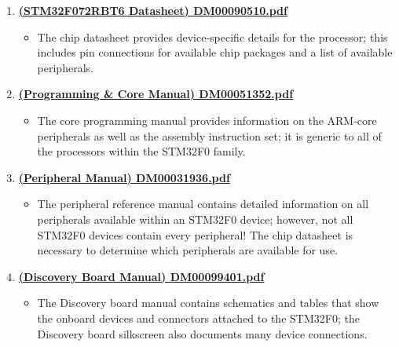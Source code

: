 \documentclass[11pt,fleqn]{book} %
\begin{document}
\begin{enumerate}
    \item \href{http://www.st.com/content/ccc/resource/technical/document/datasheet/cd/46/43/83/22/d3/40/c8/DM00090510.pdf/files/DM00090510.pdf/jcr:content/translations/en.DM00090510.pdf}{\textbf{(STM32F072RBT6 Datasheet) DM00090510.pdf}}
    \begin{itemize}
        \item The chip datasheet provides device-specific details for the processor; this includes pin connections for available chip packages and a list of available peripherals.
    \end{itemize}
    \item
    \href{http://www.st.com/content/ccc/resource/technical/document/programming_manual/fc/90/c7/17/a1/44/43/89/DM00051352.pdf/files/DM00051352.pdf/jcr:content/translations/en.DM00051352.pdf}{\textbf{(Programming \& Core Manual) DM00051352.pdf}}
    \begin{itemize}
        \item The core programming manual provides information on the ARM-core peripherals as well as the assembly instruction set; it is generic to all of the processors within the STM32F0 family.
    \end{itemize}
    \item
    \href{http://www.st.com/content/ccc/resource/technical/document/reference_manual/c2/f8/8a/f2/18/e6/43/96/DM00031936.pdf/files/DM00031936.pdf/jcr:content/translations/en.DM00031936.pdf}{\textbf{(Peripheral Manual) DM00031936.pdf}}
    \begin{itemize}
        \item The peripheral reference manual contains detailed information on all peripherals available within an STM32F0 device; however, not all STM32F0 devices contain every peripheral! The chip datasheet is necessary to determine which peripherals are available for use.
    \end{itemize}
    \item 
    \href{http://www.st.com/content/ccc/resource/technical/document/user_manual/3b/8d/46/57/b7/a9/49/b4/DM00099401.pdf/files/DM00099401.pdf/jcr:content/translations/en.DM00099401.pdf}{\textbf{(Discovery Board Manual) DM00099401.pdf}}
    \begin{itemize}
        \item The Discovery board manual contains schematics and tables that show the onboard devices and connectors attached to the STM32F0; the Discovery board silkscreen also documents many device connections. 
    \end{itemize}
\end{enumerate}
\end{document}
